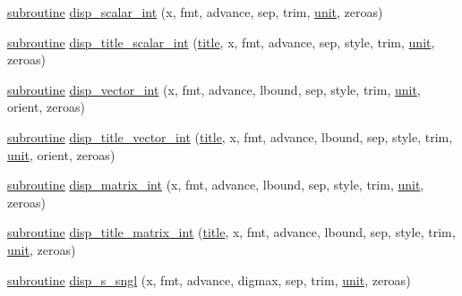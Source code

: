 \begin{DoxyCompactItemize}
\item 
\hyperlink{M__stopwatch_83_8txt_acfbcff50169d691ff02d4a123ed70482}{subroutine} \hyperlink{interfacem__display_1_1disp_a44f97005a4d8de8e604ffb4d7b949d30}{disp\+\_\+scalar\+\_\+int} (x, fmt, advance, sep, trim, \hyperlink{M__stopwatch_83_8txt_a5cbef30eb7c0d734bd82f5a7ebea9aa7}{unit}, zeroas)
\item 
\hyperlink{M__stopwatch_83_8txt_acfbcff50169d691ff02d4a123ed70482}{subroutine} \hyperlink{interfacem__display_1_1disp_a57d3c4c3ad9fc022b35a3ef9e5444661}{disp\+\_\+title\+\_\+scalar\+\_\+int} (\hyperlink{print__watch_83_8txt_a15b5bd21156bb9fca6a755ab8c029a9c}{title}, x, fmt, advance, sep, style, trim, \hyperlink{M__stopwatch_83_8txt_a5cbef30eb7c0d734bd82f5a7ebea9aa7}{unit}, zeroas)
\item 
\hyperlink{M__stopwatch_83_8txt_acfbcff50169d691ff02d4a123ed70482}{subroutine} \hyperlink{interfacem__display_1_1disp_a6bf9d3a4f4d2cde6c51c7dc07de9d175}{disp\+\_\+vector\+\_\+int} (x, fmt, advance, lbound, sep, style, trim, \hyperlink{M__stopwatch_83_8txt_a5cbef30eb7c0d734bd82f5a7ebea9aa7}{unit}, orient, zeroas)
\item 
\hyperlink{M__stopwatch_83_8txt_acfbcff50169d691ff02d4a123ed70482}{subroutine} \hyperlink{interfacem__display_1_1disp_a93ea2773de03c453470ed98231fea892}{disp\+\_\+title\+\_\+vector\+\_\+int} (\hyperlink{print__watch_83_8txt_a15b5bd21156bb9fca6a755ab8c029a9c}{title}, x, fmt, advance, lbound, sep, style, trim, \hyperlink{M__stopwatch_83_8txt_a5cbef30eb7c0d734bd82f5a7ebea9aa7}{unit}, orient, zeroas)
\item 
\hyperlink{M__stopwatch_83_8txt_acfbcff50169d691ff02d4a123ed70482}{subroutine} \hyperlink{interfacem__display_1_1disp_a85c01b9a81bee67039b193aa9904b5ba}{disp\+\_\+matrix\+\_\+int} (x, fmt, advance, lbound, sep, style, trim, \hyperlink{M__stopwatch_83_8txt_a5cbef30eb7c0d734bd82f5a7ebea9aa7}{unit}, zeroas)
\item 
\hyperlink{M__stopwatch_83_8txt_acfbcff50169d691ff02d4a123ed70482}{subroutine} \hyperlink{interfacem__display_1_1disp_a9fb1e23ed6c1f7d33d662e636ef62f6e}{disp\+\_\+title\+\_\+matrix\+\_\+int} (\hyperlink{print__watch_83_8txt_a15b5bd21156bb9fca6a755ab8c029a9c}{title}, x, fmt, advance, lbound, sep, style, trim, \hyperlink{M__stopwatch_83_8txt_a5cbef30eb7c0d734bd82f5a7ebea9aa7}{unit}, zeroas)
\item 
\hyperlink{M__stopwatch_83_8txt_acfbcff50169d691ff02d4a123ed70482}{subroutine} \hyperlink{interfacem__display_1_1disp_a82e41cbe88754a67f043ef7e9b0b0493}{disp\+\_\+s\+\_\+sngl} (x, fmt, advance, digmax, sep, trim, \hyperlink{M__stopwatch_83_8txt_a5cbef30eb7c0d734bd82f5a7ebea9aa7}{unit}, zeroas)

\end{DoxyCompactItemize}
